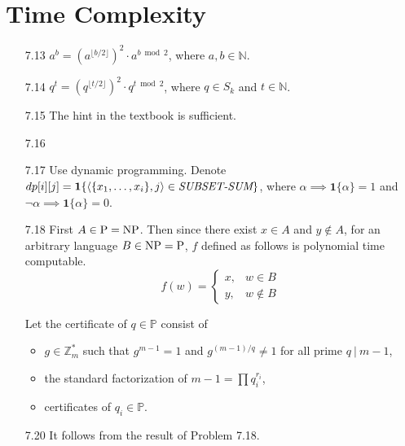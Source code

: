 \section{Time Complexity}

\begin{itemize}
	
	\item[7.13]
	$a^b = (a^{\lfloor b/2 \rfloor})^2 \cdot a^{b \bmod 2}$, where $a, b \in \mathbb{N}$.
	
	\item[7.14]
	$q^t = (q^{\lfloor t/2 \rfloor})^2 \cdot q^{t \bmod 2}$, where $q \in S_k$ and $t \in \mathbb{N}$.
	
	\item[7.15] 
	The hint in the textbook is sufficient.
	
	\item[7.16]
	\Omit
	
	\item[7.17]
	Use dynamic programming. Denote $dp[i][j] = \boldsymbol{1}\{ \langle {\{x_1, \dots, x_i\}, j} \rangle \in \textit{SUBSET-SUM} \}$, where $\alpha \implies \boldsymbol{1}\{\alpha\} = 1$ and $\neg \alpha \implies \boldsymbol{1}\{\alpha\} = 0$.
	
	\item[7.18]
	First $A \in \textrm{P} = \textrm{NP}$. Then since there exist $x \in A$ and $y \notin A$, for an arbitrary language $B \in \textrm{NP} = \textrm{P}$, $f$ defined as follows is polynomial time computable.
	$$
		f(w) = 
		\left\{
			\begin{array}{ll}
				x, & w \in B \\
				y, & w \notin B
			\end{array}
		\right.
	$$
	
	\item[\Star 7.19]
	Let the certificate of $q \in \mathbb{P}$ consist of
	\begin{itemize}
		\item $g \in \mathbb{Z}_m^*$ such that $g^{m-1}=1$ and $g^{(m-1)/q} \neq 1$ for all prime $q \ | \ m-1$,
		\item the standard factorization of $m-1 = \prod q_i^{r_i}$,
		\item certificates of $q_i \in \mathbb{P}$.
	\end{itemize} 

	\item[7.20]
	It follows from the result of Problem 7.18.
	

\end{itemize}
